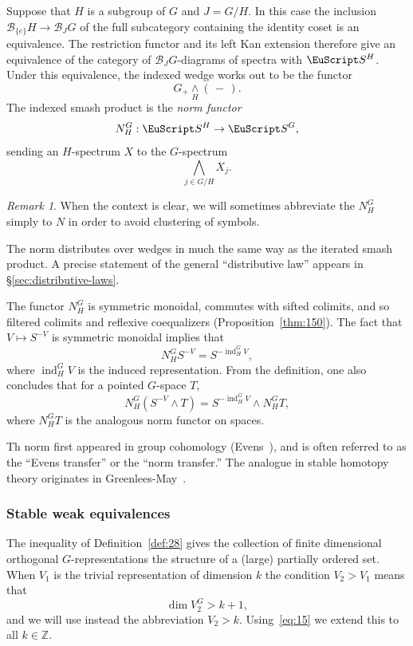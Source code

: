 \documentclass{amsart}
\newtheorem{rem}[equation]{Remark}
\theoremstyle{definition}
\theoremstyle{remark}
\newtheorem{rem}[equation]{Remark}
\newcommand{\Z}{{\mathbb Z}}
\newcommand{\slot}{\,-\,}
\newcommand{\spectra}{\EuScript S}
\newcommand{\smashove}[1]{\underset{#1}{\wedge}}
\newcommand{\norm}{N}
\DeclareMathOperator{\ind}{ind}
\newcommand{\ugspectra}[1]{\spectra^{#1}}
\newcommand{\cat}[1]{{\mathcal #1}}
\begin{document}
Suppose that $H$ is a subgroup of $G$ and $J=G/H$.  In this case the
inclusion $\cat{B}_{\{e \}}H\to \cat{B}_{J}G$ of the full subcategory
containing the identity coset is an equivalence.  The restriction
functor and its left Kan extension therefore give an equivalence of
the category of $\cat{B}_{J}G$-diagrams of spectra with
$\ugspectra{H}$.  Under this equivalence, the indexed wedge works out
to be the functor
\[
G_{+}\smashove{H}(\slot).
\]
The indexed smash product is the {\em norm functor} 
\[
\norm_{H}^{G}:\ugspectra{H}\to \ugspectra{G},
\]
sending an $H$-spectrum $X$ to the $G$-spectrum
\[
\bigwedge_{j\in G/H}X_{j}.
\]


\begin{rem}
\label{rem:56} When the context is clear, we will sometimes abbreviate
the $\norm_{H}^{G}$ simply to $\norm$ in order to avoid clustering of
symbols.
\end{rem}

The norm distributes over wedges in much the same way as the iterated
smash product.  A precise statement of the general ``distributive
law'' appears in \S\ref{sec:distributive-laws}.

The functor $\norm_{H}^{G}$ is symmetric monoidal, commutes with
sifted colimits, and so filtered colimits and reflexive coequalizers
(Proposition~\ref{thm:150}).  The fact that $V\mapsto S^{-V}$ is
symmetric monoidal implies that
\begin{equation}
\label{eq:103}
\norm_{H}^{G}S^{-V} = S^{-\ind_{H}^{G}V},
\end{equation}
where $\ind_{H}^{G}V$ is the induced representation.   From the
definition, one also concludes that for a pointed $G$-space $T$,
\[
\norm_{H}^{G}\left(S^{-V}\wedge T\right) = S^{-\ind_{H}^{G}V}\wedge \norm_{H}^{G}T,
\]
where $\norm_{H}^{G}T$ is the analogous norm functor on spaces.

Th norm first appeared in group cohomology (Evens~\cite{MR0153725}),
and is often referred to as the ``Evens transfer'' or the ``norm
transfer.''  The analogue in stable homotopy theory originates in
Greenlees-May~\cite{MR1491447}.

\subsubsection{Stable weak equivalences} 
\label{sec:homot-theory-ugsp}

The inequality of Definition~\ref{def:28} gives the collection of
finite dimensional orthogonal $G$-representations the structure of a
(large) partially ordered set.  When $V_{1}$ is the trivial
representation of dimension $k$ the condition $V_{2}>V_{1}$ means that
\begin{equation}
\label{eq:15}
\dim V_{2}^{G}>k+1,
\end{equation}
and we will use instead the abbreviation $V_{2}>k$.
Using~\eqref{eq:15} we extend this to all $k\in\Z$.
\end{document}
